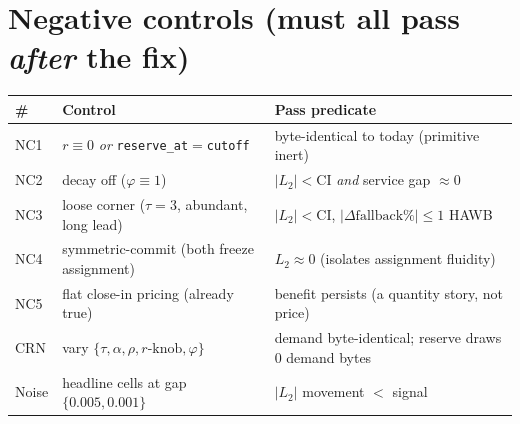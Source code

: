 \documentclass[11pt]{article}
\newcommand{\resv}{r}
\newcommand{\code}[1]{\texttt{#1}}
\begin{document}
\section{Negative controls (must all pass \emph{after} the fix)}\label{sec:controls}
\begin{center}
\begin{tabular}{@{}lll@{}}
\toprule
\# & Control & Pass predicate \\
\midrule
NC1 & $\resv\equiv0$ \emph{or} \code{reserve\_at}$=$\code{cutoff} & byte-identical to today (primitive inert) \\
NC2 & decay off ($\varphi\equiv1$) & $|L_2|<\mathrm{CI}$ \emph{and} service gap $\approx0$ \\
NC3 & loose corner ($\tau{=}3$, abundant, long lead) & $|L_2|<\mathrm{CI}$, $|\Delta\text{fallback\%}|\le1$ HAWB \\
NC4 & symmetric-commit (both freeze assignment) & $L_2\approx0$ (isolates assignment fluidity) \\
NC5 & flat close-in pricing (already true) & benefit persists (a quantity story, not price) \\
CRN & vary $\{\tau,\alpha,\rho,\resv\text{-knob},\varphi\}$ & demand byte-identical; reserve draws 0 demand bytes \\
Noise & headline cells at gap $\{0.005,0.001\}$ & $|L_2|$ movement $<$ signal \\
\bottomrule
\end{tabular}
\end{center}

\end{document}
